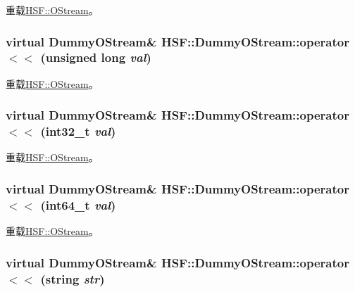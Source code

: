 重载\hyperlink{classHSF_1_1OStream_aa0cd93dd86633a0603d09d35e20c9520}{HSF::OStream}。\hypertarget{classHSF_1_1DummyOStream_a7c3f9f5c2e3a05760819499df1aa6592}{
\subsubsection[{operator$<$$<$}]{\setlength{\rightskip}{0pt plus 5cm}virtual {\bf DummyOStream}\& HSF::DummyOStream::operator$<$$<$ (unsigned long {\em val})}}
\label{classHSF_1_1DummyOStream_a7c3f9f5c2e3a05760819499df1aa6592}


重载\hyperlink{classHSF_1_1OStream_ae4edb4f375ace6dab22021629c29a24f}{HSF::OStream}。\hypertarget{classHSF_1_1DummyOStream_a58e20bb47f254b73898d940bb496ee1f}{
\subsubsection[{operator$<$$<$}]{\setlength{\rightskip}{0pt plus 5cm}virtual {\bf DummyOStream}\& HSF::DummyOStream::operator$<$$<$ (int32\_\-t {\em val})}}
\label{classHSF_1_1DummyOStream_a58e20bb47f254b73898d940bb496ee1f}


重载\hyperlink{classHSF_1_1OStream_a1bbf47f6f3c68938fb4c1006b878aa60}{HSF::OStream}。\hypertarget{classHSF_1_1DummyOStream_a439a7fa1b22a1e7bcc49fa43c686dc0d}{
\subsubsection[{operator$<$$<$}]{\setlength{\rightskip}{0pt plus 5cm}virtual {\bf DummyOStream}\& HSF::DummyOStream::operator$<$$<$ (int64\_\-t {\em val})}}
\label{classHSF_1_1DummyOStream_a439a7fa1b22a1e7bcc49fa43c686dc0d}


重载\hyperlink{classHSF_1_1OStream_a771b87dab59786db30cf1d5eb5473e64}{HSF::OStream}。\hypertarget{classHSF_1_1DummyOStream_ab67a98f5212d00528d5dda50e9858b7b}{
\subsubsection[{operator$<$$<$}]{\setlength{\rightskip}{0pt plus 5cm}virtual {\bf DummyOStream}\& HSF::DummyOStream::operator$<$$<$ (string {\em str})}}
\label{classHSF_1_1DummyOStream_ab67a98f5212d00528d5dda50e9858b7b}


